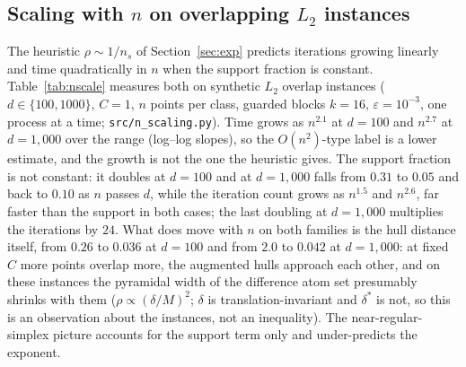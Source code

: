 \documentclass[pdflatex,sn-apa]{sn-jnl}%
\theoremstyle{thmstyleone}
\theoremstyle{thmstyletwo}
\begin{document}
\subsection{Scaling with \texorpdfstring{$n$}{n} on overlapping $L_2$ instances}\label{sec:nscale}
The heuristic $\rho\sim1/n_s$ of Section~\ref{sec:exp} predicts
iterations growing linearly and time quadratically in $n$ when the
support fraction is constant. Table~\ref{tab:nscale} measures both on
synthetic $L_2$ overlap instances ($d\in\{100,1000\}$, $C{=}1$,
$n$ points per class, guarded blocks $k{=}16$, $\varepsilon=10^{-3}$,
one process at a time; \texttt{src/n\_scaling.py}). Time grows as
$n^{2.1}$ at $d{=}100$ and $n^{2.7}$ at $d{=}1{,}000$ over the range
(log--log slopes), so the $O(n^2)$-type label is a lower estimate, and
the growth is not the one the heuristic gives. The support fraction is
not constant: it doubles at $d{=}100$ and at $d{=}1{,}000$ falls from
$0.31$ to $0.05$ and back to $0.10$ as $n$ passes $d$, while the
iteration count grows as $n^{1.5}$ and $n^{2.6}$, far faster than the
support in both cases; the last doubling at $d{=}1{,}000$ multiplies
the iterations by $24$. What does move with $n$ on both families is the
hull distance itself, from $0.26$ to $0.036$ at $d{=}100$ and from
$2.0$ to $0.042$ at $d{=}1{,}000$: at fixed $C$ more points overlap
more, the augmented hulls approach each other, and on these instances
the pyramidal width of the difference atom set presumably shrinks with
them ($\rho\propto(\delta/M)^2$; $\delta$ is translation-invariant and
$\delta^*$ is not, so this is an observation about the instances, not
an inequality). The near-regular-simplex picture accounts for the
support term only and under-predicts the exponent.
\end{document}
